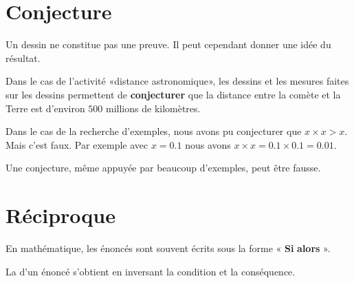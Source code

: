 


\section{Conjecture}

\begin{Aretenir}
    Un dessin ne constitue pas une preuve. Il peut cependant donner une idée du résultat.
\end{Aretenir}

Dans le cas de l'activité «distance astronomique», les dessins et les mesures faites sur les dessins permettent de {\bf conjecturer} que la distance entre la comète et la Terre est d'environ \( 500\) millions de kilomètres.

Dans le cas de la recherche d'exemples, nous avons pu conjecturer que \( x\times x >x\). Mais c'est faux. Par exemple avec \( x=0.1\) nous avons \( x\times x=0.1\times 0.1=0.01\).

\begin{Aretenir}
    Une conjecture, même appuyée par beaucoup d'exemples, peut être fausse.
\end{Aretenir}

\section{Réciproque}

En mathématique, les énoncés sont souvent écrits sous la forme « {\bf Si}  {\bf alors} ».

\begin{definition}
    La  d'un énoncé s'obtient en inversant la condition et la conséquence.
\end{definition}


